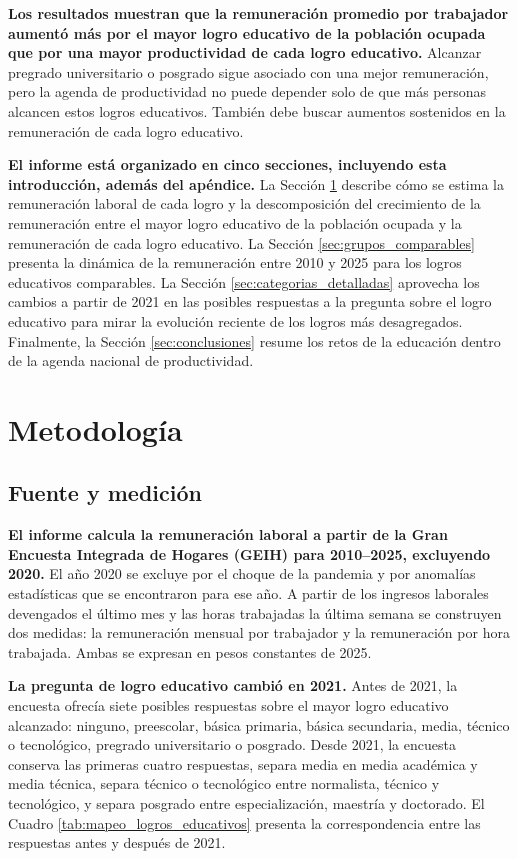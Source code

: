 \textbf{Los resultados muestran que la remuneración promedio por trabajador aumentó más por el mayor logro educativo de la población ocupada que por una mayor productividad de cada logro educativo.} Alcanzar pregrado universitario o posgrado sigue asociado con una mejor remuneración, pero la agenda de productividad no puede depender solo de que más personas alcancen estos logros educativos. También debe buscar aumentos sostenidos en la remuneración de cada logro educativo.

\textbf{El informe está organizado en cinco secciones, incluyendo esta introducción, además del apéndice.} La Sección \ref{sec:metodologia} describe cómo se estima la remuneración laboral de cada logro y la descomposición del crecimiento de la remuneración entre el mayor logro educativo de la población ocupada y la remuneración de cada logro educativo. La Sección \ref{sec:grupos_comparables} presenta la dinámica de la remuneración entre 2010 y 2025 para los logros educativos comparables. La Sección \ref{sec:categorias_detalladas} aprovecha los cambios a partir de 2021 en las posibles respuestas a la pregunta sobre el logro educativo para mirar la evolución reciente de los logros más desagregados. Finalmente, la Sección \ref{sec:conclusiones} resume los retos de la educación dentro de la agenda nacional de productividad.

\section{Metodología}\label{sec:metodologia}

\subsection{Fuente y medición}

\textbf{El informe calcula la remuneración laboral a partir de la Gran Encuesta Integrada de Hogares (GEIH) para 2010--2025, excluyendo 2020.} El año 2020 se excluye por el choque de la pandemia y por anomalías estadísticas que se encontraron para ese año. A partir de los ingresos laborales devengados el último mes y las horas trabajadas la última semana se construyen dos medidas: la remuneración mensual por trabajador y la remuneración por hora trabajada. Ambas se expresan en pesos constantes de 2025. 

\textbf{La pregunta de logro educativo cambió en 2021.} Antes de 2021, la encuesta ofrecía siete posibles respuestas sobre el mayor logro educativo alcanzado: ninguno, preescolar, básica primaria, básica secundaria, media, técnico o tecnológico, pregrado universitario o posgrado. Desde 2021, la encuesta conserva las primeras cuatro respuestas, separa media en media académica y media técnica, separa técnico o tecnológico entre normalista, técnico y tecnológico, y separa posgrado entre especialización, maestría y doctorado.
El Cuadro \ref{tab:mapeo_logros_educativos} presenta la correspondencia entre las respuestas antes y después de 2021.

